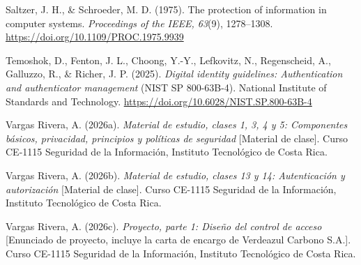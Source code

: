 \documentclass[11pt,letterpaper]{article}
\begin{document}
{Saltzer, J. H., \& Schroeder, M. D. (1975). The protection of information in computer systems.
\emph{Proceedings of the IEEE, 63}(9), 1278--1308. \url{https://doi.org/10.1109/PROC.1975.9939}

Temoshok, D., Fenton, J. L., Choong, Y.-Y., Lefkovitz, N., Regenscheid, A., Galluzzo, R., \& Richer,
J. P. (2025). \emph{Digital identity guidelines: Authentication and authenticator management} (NIST SP
800-63B-4). National Institute of Standards and Technology.
\url{https://doi.org/10.6028/NIST.SP.800-63B-4}

Vargas Rivera, A. (2026a). \emph{Material de estudio, clases 1, 3, 4 y 5: Componentes básicos,
privacidad, principios y políticas de seguridad} [Material de clase]. Curso CE-1115 Seguridad de la
Información, Instituto Tecnológico de Costa Rica.

Vargas Rivera, A. (2026b). \emph{Material de estudio, clases 13 y 14: Autenticación y autorización}
[Material de clase]. Curso CE-1115 Seguridad de la Información, Instituto Tecnológico de Costa Rica.

Vargas Rivera, A. (2026c). \emph{Proyecto, parte 1: Diseño del control de acceso} [Enunciado de
proyecto, incluye la carta de encargo de Verdeazul Carbono S.A.]. Curso CE-1115 Seguridad de la
Información, Instituto Tecnológico de Costa Rica.

}
\end{document}
